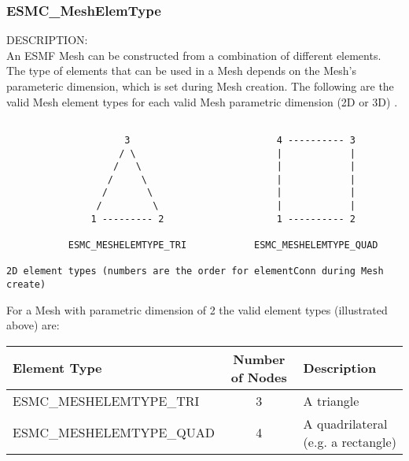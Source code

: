 
\subsubsection{ESMC\_MeshElemType}
\label{sec:mesh:opt:elemtype}

 {\sf DESCRIPTION:\\}
 An ESMF Mesh can be constructed from a combination of different elements. The type of elements that can
be used in a Mesh depends on the Mesh's parameteric dimension, which is set during Mesh creation. The
following are the valid Mesh element types for each valid Mesh parametric dimension (2D or 3D) .

\medskip

\begin{verbatim}

                     3                          4 ---------- 3
                    / \                         |            |  
                   /   \                        |            |
                  /     \                       |            |
                 /       \                      |            |
                /         \                     |            |
               1 --------- 2                    1 ---------- 2

           ESMC_MESHELEMTYPE_TRI            ESMC_MESHELEMTYPE_QUAD

2D element types (numbers are the order for elementConn during Mesh create)

\end{verbatim}

For a Mesh with parametric dimension of 2 the valid element types (illustrated above) are:

\smallskip

\begin{tabular}{|l|c|l|}
\hline
Element Type &  Number of Nodes  & Description \\
\hline
ESMC\_MESHELEMTYPE\_TRI  & 3 & A triangle \\
ESMC\_MESHELEMTYPE\_QUAD & 4 & A quadrilateral (e.g. a rectangle) \\
\hline
\end{tabular}

\medskip
\medskip

